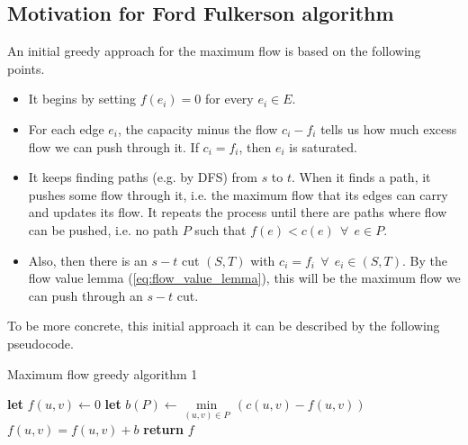 \documentclass[a4paper]{article}
\begin{document}
\newpage
\subsection{Motivation for Ford Fulkerson algorithm}
\label{app:ffa_motivation}

An initial greedy approach for the maximum flow is based on the following points.

\begin{itemize}
    \item It begins by setting $f(e_i)=0$ for every $e_i \in E$.
    \item For each edge $e_i$, the capacity minus the flow $c_i - f_i$ tells us how much excess flow we can push through it. If $c_i = f_i$, then $e_i$ is saturated.
    \item It keeps finding paths (e.g. by DFS) from $s$ to $t$. When it finds a path, it pushes some  flow through it, i.e. the maximum flow that its edges can carry and updates its flow. It repeats the process until there are paths where flow can be pushed, i.e. no path $P$ such that $f(e)<c(e)\ \ \forall \ \ e \in P$. 
    \item Also, then there is an $s-t$ cut $(S,T)$ with $c_i = f_i \ \ \forall \ \ e_i \in (S,T)$. By the flow value lemma (\eqref{eq:flow_value_lemma}), this will be the maximum flow we can push through an $s-t$ cut.
\end{itemize}
To be more concrete, this initial approach it can be described by the following pseudocode.
\begin{algorithm}[H] %
\caption{Maximum flow greedy algorithm 1}\label{alg:max_flow_algo_1}
\begin{algorithmic}[1]
\State {}
\State {}
 
\State \textbf{let} $f(u,v) \leftarrow 0$
\EndFor
{}
\State \textbf{let} $b(P)\leftarrow \underset{\left( u,v \right)\in P}{\mathop{\min }}\,\left( c\left( u,v \right)-f\left( u,v \right) \right) $ 
\State $f(u,v) = f(u,v) + b$
\EndFor
\EndWhile
\State \textbf{return} $f$
\EndProcedure
\end{algorithmic}
\end{algorithm}
\end{document}
